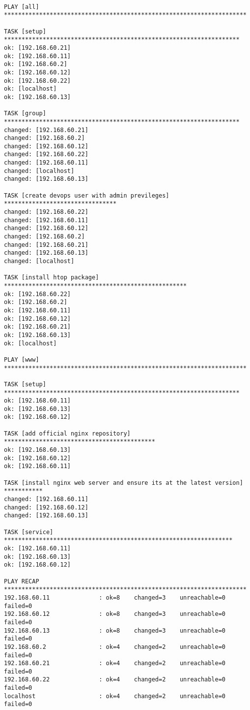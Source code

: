 \documentclass[11pt]{article}
\begin{document}
    \begin{Verbatim}[commandchars=\\\{\}]

PLAY [all] *********************************************************************

TASK [setup] *******************************************************************
ok: [192.168.60.21]
ok: [192.168.60.11]
ok: [192.168.60.2]
ok: [192.168.60.12]
ok: [192.168.60.22]
ok: [localhost]
ok: [192.168.60.13]

TASK [group] *******************************************************************
changed: [192.168.60.21]
changed: [192.168.60.2]
changed: [192.168.60.12]
changed: [192.168.60.22]
changed: [192.168.60.11]
changed: [localhost]
changed: [192.168.60.13]

TASK [create devops user with admin previleges] ********************************
changed: [192.168.60.22]
changed: [192.168.60.11]
changed: [192.168.60.12]
changed: [192.168.60.2]
changed: [192.168.60.21]
changed: [192.168.60.13]
changed: [localhost]

TASK [install htop package] ****************************************************
ok: [192.168.60.22]
ok: [192.168.60.2]
ok: [192.168.60.11]
ok: [192.168.60.12]
ok: [192.168.60.21]
ok: [192.168.60.13]
ok: [localhost]

PLAY [www] *********************************************************************

TASK [setup] *******************************************************************
ok: [192.168.60.11]
ok: [192.168.60.13]
ok: [192.168.60.12]

TASK [add official nginx repository] *******************************************
ok: [192.168.60.13]
ok: [192.168.60.12]
ok: [192.168.60.11]

TASK [install nginx web server and ensure its at the latest version] ***********
changed: [192.168.60.11]
changed: [192.168.60.12]
changed: [192.168.60.13]

TASK [service] *****************************************************************
ok: [192.168.60.11]
ok: [192.168.60.13]
ok: [192.168.60.12]

PLAY RECAP *********************************************************************
192.168.60.11              : ok=8    changed=3    unreachable=0    failed=0   
192.168.60.12              : ok=8    changed=3    unreachable=0    failed=0   
192.168.60.13              : ok=8    changed=3    unreachable=0    failed=0   
192.168.60.2               : ok=4    changed=2    unreachable=0    failed=0   
192.168.60.21              : ok=4    changed=2    unreachable=0    failed=0   
192.168.60.22              : ok=4    changed=2    unreachable=0    failed=0   
localhost                  : ok=4    changed=2    unreachable=0    failed=0   


    \end{Verbatim}
\end{document}
